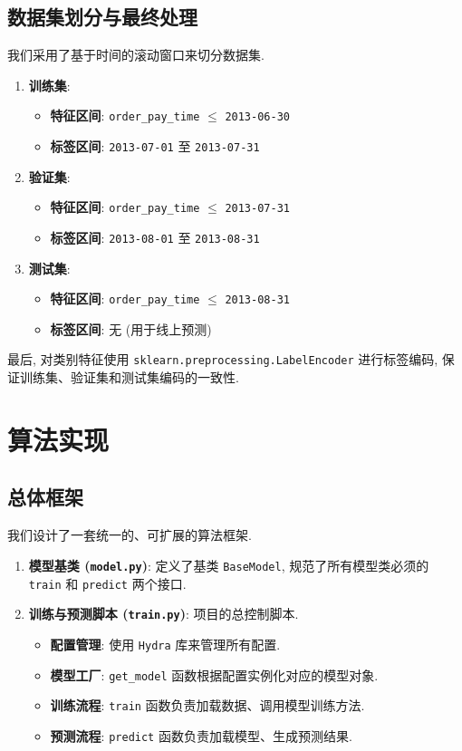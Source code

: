 \documentclass[11pt, a4paper]{article}
\begin{document}
\subsection{数据集划分与最终处理}
我们采用了基于时间的滚动窗口来切分数据集.
\begin{enumerate}
    \item \textbf{训练集}:
    \begin{itemize}
        \item \textbf{特征区间}: \texttt{order\_pay\_time} $\le$ \texttt{2013-06-30}
        \item \textbf{标签区间}: \texttt{2013-07-01} 至 \texttt{2013-07-31}
    \end{itemize}
    \item \textbf{验证集}:
    \begin{itemize}
        \item \textbf{特征区间}: \texttt{order\_pay\_time} $\le$ \texttt{2013-07-31}
        \item \textbf{标签区间}: \texttt{2013-08-01} 至 \texttt{2013-08-31}
    \end{itemize}
    \item \textbf{测试集}:
    \begin{itemize}
        \item \textbf{特征区间}: \texttt{order\_pay\_time} $\le$ \texttt{2013-08-31}
        \item \textbf{标签区间}: 无 (用于线上预测)
    \end{itemize}
\end{enumerate}
最后, 对类别特征使用 \texttt{sklearn.preprocessing.LabelEncoder} 进行标签编码, 保证训练集、验证集和测试集编码的一致性.

\section{算法实现}
\subsection{总体框架}
我们设计了一套统一的、可扩展的算法框架.
\begin{enumerate}
    \item \textbf{模型基类 (\texttt{model.py})}: 定义了基类 \texttt{BaseModel}, 规范了所有模型类必须的 \texttt{train} 和 \texttt{predict} 两个接口.
    \item \textbf{训练与预测脚本 (\texttt{train.py})}: 项目的总控制脚本.
    \begin{itemize}
        \item \textbf{配置管理}: 使用 \texttt{Hydra} 库来管理所有配置.
        \item \textbf{模型工厂}: \texttt{get\_model} 函数根据配置实例化对应的模型对象.
        \item \textbf{训练流程}: \texttt{train} 函数负责加载数据、调用模型训练方法.
        \item \textbf{预测流程}: \texttt{predict} 函数负责加载模型、生成预测结果.
    \end{itemize}
\end{enumerate}
\end{document}
